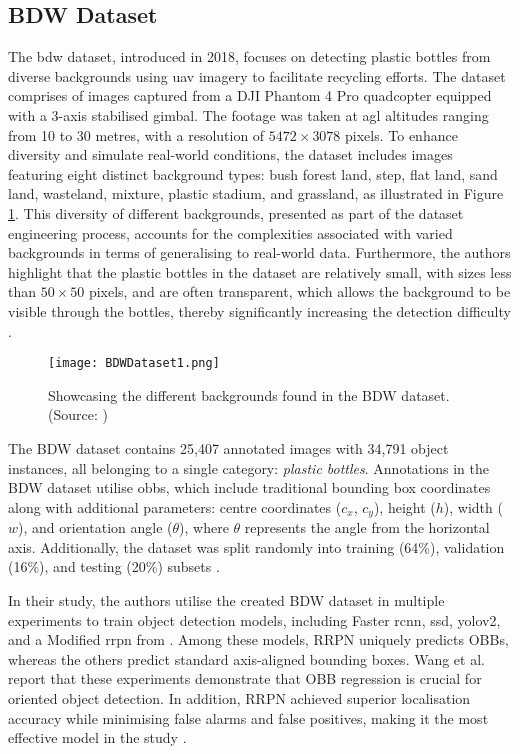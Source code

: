 \subsection{BDW Dataset}
\label{subsec:3_bdw}

The \gls{bdw} dataset, introduced in 2018, focuses on detecting plastic bottles from diverse backgrounds using \gls{uav} imagery to facilitate recycling efforts. The dataset comprises of images captured from a DJI Phantom 4 Pro quadcopter equipped with a 3-axis stabilised gimbal. The footage was taken at \gls{agl} altitudes ranging from 10 to 30 metres, with a resolution of $5472 \times 3078$ pixels. 
To enhance diversity and simulate real-world conditions, the dataset includes images featuring eight distinct background types: bush forest land, step, flat land, sand land, wasteland, mixture, plastic stadium, and grassland, as illustrated in Figure \ref{fig:bdw}. This diversity of different backgrounds, presented as part of the dataset engineering process, accounts for the complexities associated with varied backgrounds in terms of generalising to real-world data. Furthermore, the authors highlight that the plastic bottles in the dataset are relatively small, with sizes less than $50 \times 50$ pixels, and are often transparent, which allows the background to be visible through the bottles, thereby significantly increasing the detection difficulty \cite{bdwdataset}.

\begin{figure}[!htbp]
    \centering
    \texttt{[image: BDWDataset1.png]}
    \caption{Showcasing the different backgrounds found in the BDW dataset. (Source: \cite{bdwdataset})}
    \label{fig:bdw}
\end{figure}

The BDW dataset contains 25,407 annotated images with 34,791 object instances, all belonging to a single category: \textit{plastic bottles}. Annotations in the BDW dataset utilise \gls{obbs}, which include traditional bounding box coordinates along with additional parameters: centre coordinates ($c_x$, $c_y$), height ($h$), width ($w$), and orientation angle ($\theta$), where $\theta$ represents the angle from the horizontal axis. Additionally, the dataset was split randomly into training (64\%), validation (16\%), and testing (20\%) subsets \cite{bdwdataset}.

In their study, the authors utilise the created BDW dataset in multiple experiments to train object detection models, including Faster \gls{rcnn}, \gls{ssd}, \gls{yolo}v2, and a Modified \gls{rrpn} from \cite{rrpn}. Among these models, RRPN uniquely predicts OBBs, whereas the others predict standard axis-aligned bounding boxes. Wang et al. report that these experiments demonstrate that OBB regression is crucial for oriented object detection. In addition, RRPN achieved superior localisation accuracy while minimising false alarms and false positives, making it the most effective model in the study \cite{bdwdataset}.

